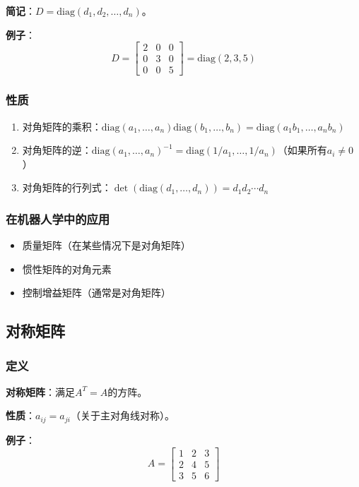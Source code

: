 \documentclass[12pt,a4paper]{article}
\begin{document}
\textbf{简记}：$D = \text{diag}(d_1, d_2, \ldots, d_n)$。

\textbf{例子}：
\begin{equation}
D = \begin{bmatrix} 2 & 0 & 0 \\ 0 & 3 & 0 \\ 0 & 0 & 5 \end{bmatrix} = \text{diag}(2, 3, 5)
\end{equation}

\subsubsection{性质}

\begin{enumerate}
\item 对角矩阵的乘积：$\text{diag}(a_1, \ldots, a_n) \text{diag}(b_1, \ldots, b_n) = \text{diag}(a_1 b_1, \ldots, a_n b_n)$
\item 对角矩阵的逆：$\text{diag}(a_1, \ldots, a_n)^{-1} = \text{diag}(1/a_1, \ldots, 1/a_n)$（如果所有$a_i \neq 0$）
\item 对角矩阵的行列式：$\det(\text{diag}(d_1, \ldots, d_n)) = d_1 d_2 \cdots d_n$
\end{enumerate}

\subsubsection{在机器人学中的应用}

\begin{itemize}
\item 质量矩阵（在某些情况下是对角矩阵）
\item 惯性矩阵的对角元素
\item 控制增益矩阵（通常是对角矩阵）
\end{itemize}

\subsection{对称矩阵}

\subsubsection{定义}

\textbf{对称矩阵}：满足$A^T = A$的方阵。

\textbf{性质}：$a_{ij} = a_{ji}$（关于主对角线对称）。

\textbf{例子}：
\begin{equation}
A = \begin{bmatrix} 1 & 2 & 3 \\ 2 & 4 & 5 \\ 3 & 5 & 6 \end{bmatrix}
\end{equation}
\end{document}
